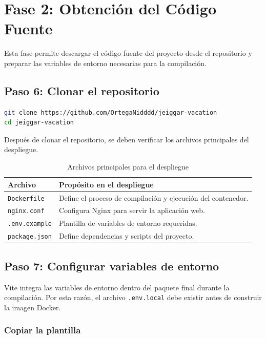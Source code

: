 \documentclass[12pt,letterpaper]{article}
\newcommand{\code}[1]{\nolinkurl{#1}}
\begin{document}
\section{Fase 2: Obtención del Código Fuente}

Esta fase permite descargar el código fuente del proyecto desde el repositorio y preparar las variables de entorno necesarias para la compilación.

\subsection{Paso 6: Clonar el repositorio}

\begin{lstlisting}[language=bash]
git clone https://github.com/OrtegaNidddd/jeiggar-vacation
cd jeiggar-vacation
\end{lstlisting}

Después de clonar el repositorio, se deben verificar los archivos principales del despliegue.

\begin{longtable}{|p{}|p{}|}
\caption{Archivos principales para el despliegue}\\
\hline
\textbf{Archivo} & \textbf{Propósito en el despliegue} \\
\hline
\code{Dockerfile} & Define el proceso de compilación y ejecución del contenedor. \\
\hline
\code{nginx.conf} & Configura Nginx para servir la aplicación web. \\
\hline
\code{.env.example} & Plantilla de variables de entorno requeridas. \\
\hline
\code{package.json} & Define dependencias y scripts del proyecto. \\
\hline
\end{longtable}

\subsection{Paso 7: Configurar variables de entorno}

Vite integra las variables de entorno dentro del paquete final durante la compilación. Por esta razón, el archivo \code{.env.local} debe existir antes de construir la imagen Docker.

\subsubsection*{Copiar la plantilla}
\end{document}
